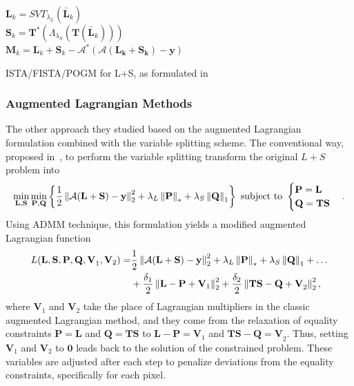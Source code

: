 \begin{algorithm}
{        $\mathbf{L}_k = SVT_{\lambda_L}(\mathbf{\bar{L}}_k)$\\
        $\mathbf{S}_k = \mathbf{T}^*\left(\Lambda_{\lambda_S}\left(\mathbf{T}(\mathbf{\bar{L}}_k)\right)\right)$\\
        
        $\mathbf{M}_k = \mathbf{L}_k + \mathbf{S}_k - \mathcal{A}^*(\mathcal{A} (\mathbf{L_k + S_k}) - \mathbf{y})$
    }
    \caption{ISTA/FISTA/POGM for L+S, as formulated in~\cite{lin_efficient_2019}}
    \label{alg:lin_pgm}
\end{algorithm}

\subsubsection{Augmented Lagrangian Methods}
The other approach they studied based on the augmented Lagrangian formulation combined with the variable splitting scheme. The conventional way, proposed in~\cite{tremoulheac_dynamic_2014}, to perform the variable splitting transform the original $L+S$ problem into 
\[\min_{\mathbf{L,S}}\min_{\mathbf{P,Q}} \left\{\frac{1}{2}\left\lVert\mathcal{A}(\mathbf{L+S}) - \mathbf{y}\right\rVert_2^2 + \lambda_L \left\lVert\mathbf{P}\right\rVert_* + \lambda_S \left\lVert\mathbf{Q}\right\rVert_1\right\} \textrm{ subject to } \begin{cases} \mathbf{P = L} \\ \mathbf{Q = TS} \end{cases}.\]
Using ADMM technique, this formulation yields a modified augmented Lagrangian function
\begin{align*}
L(\mathbf{L, S, P, Q, V}_1, \mathbf{V}_2) = & \frac{1}{2}\left\lVert\mathcal{A}(\mathbf{L+S}) - \mathbf{y}\right\rVert_2^2 + \lambda_L \left\lVert\mathbf{P}\right\rVert_* + \lambda_S \left\lVert\mathbf{Q}\right\rVert_1 + \ldots \\ & + \frac{\delta_1}{2}\left\lVert\mathbf{L - P + V}_1\right\rVert_2^2 + \frac{\delta_2}{2}\left\lVert\mathbf{TS - Q + V}_2\right\rVert_2^2,
\end{align*}
where $\mathbf{V}_1$ and $\mathbf{V}_2$ take the place of Lagrangian multipliers in the classic augmented Lagrangian method, and they come from the relaxation of equality constraints $\mathbf{P = L}$ and $\mathbf{Q = TS}$ to $\mathbf{L - P = V}_1$ and $\mathbf{TS - Q = V}_2$. Thus, setting $\mathbf{V}_1$ and $\mathbf{V}_2$ to $\mathbf{0}$ leads back to the solution of the constrained problem. These variables are adjusted after each step to penalize deviations from the equality constraints, specifically for each pixel.

